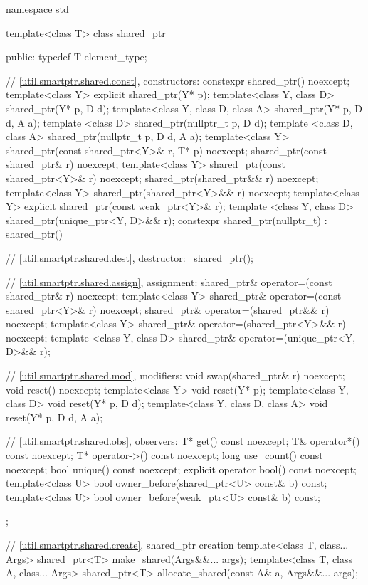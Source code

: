 \begin{codeblock}
namespace std {
  template<class T> class shared_ptr {
  public:
    typedef T element_type;

    // \ref{util.smartptr.shared.const}, constructors:
    constexpr shared_ptr() noexcept;
    template<class Y> explicit shared_ptr(Y* p);
    template<class Y, class D> shared_ptr(Y* p, D d);
    template<class Y, class D, class A> shared_ptr(Y* p, D d, A a);
    template <class D> shared_ptr(nullptr_t p, D d);
    template <class D, class A> shared_ptr(nullptr_t p, D d, A a);
    template<class Y> shared_ptr(const shared_ptr<Y>& r, T* p) noexcept;
    shared_ptr(const shared_ptr& r) noexcept;
    template<class Y> shared_ptr(const shared_ptr<Y>& r) noexcept;
    shared_ptr(shared_ptr&& r) noexcept;
    template<class Y> shared_ptr(shared_ptr<Y>&& r) noexcept;
    template<class Y> explicit shared_ptr(const weak_ptr<Y>& r);
    template <class Y, class D> shared_ptr(unique_ptr<Y, D>&& r);
    constexpr shared_ptr(nullptr_t) : shared_ptr() { }

    // \ref{util.smartptr.shared.dest}, destructor:
    ~shared_ptr();

    // \ref{util.smartptr.shared.assign}, assignment:
    shared_ptr& operator=(const shared_ptr& r) noexcept;
    template<class Y> shared_ptr& operator=(const shared_ptr<Y>& r) noexcept;
    shared_ptr& operator=(shared_ptr&& r) noexcept;
    template<class Y> shared_ptr& operator=(shared_ptr<Y>&& r) noexcept;
    template <class Y, class D> shared_ptr& operator=(unique_ptr<Y, D>&& r);

    // \ref{util.smartptr.shared.mod}, modifiers:
    void swap(shared_ptr& r) noexcept;
    void reset() noexcept;
    template<class Y> void reset(Y* p);
    template<class Y, class D> void reset(Y* p, D d);
    template<class Y, class D, class A> void reset(Y* p, D d, A a);

    // \ref{util.smartptr.shared.obs}, observers:
    T* get() const noexcept;
    T& operator*() const noexcept;
    T* operator->() const noexcept;
    long use_count() const noexcept;
    bool unique() const noexcept;
    explicit operator bool() const noexcept;
    template<class U> bool owner_before(shared_ptr<U> const& b) const;
    template<class U> bool owner_before(weak_ptr<U> const& b) const;
  };

  // \ref{util.smartptr.shared.create}, shared_ptr creation
  template<class T, class... Args> shared_ptr<T> make_shared(Args&&... args);
  template<class T, class A, class... Args>
    shared_ptr<T> allocate_shared(const A& a, Args&&... args);

}
\end{codeblock}
